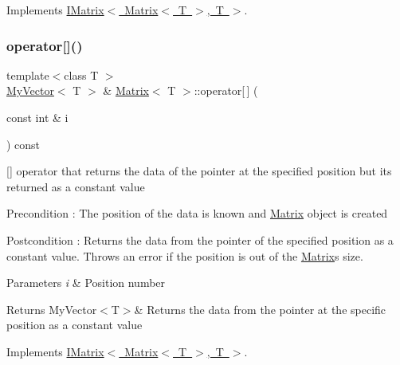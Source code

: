 Implements \mbox{\hyperlink{class_i_matrix_a3cfb2490e2849c6c19c1979066a64818}{I\+Matrix$<$ Matrix$<$ T $>$, T $>$}}.

\mbox{\label{class_matrix_a56c7f18f272e74bee2b616eba702fc87}} 
\subsubsection{\texorpdfstring{operator[]()}{operator[]()}\hspace{0.1cm}{\footnotesize\ttfamily [2/2]}}
{\footnotesize\ttfamily template$<$class T $>$ \\
\mbox{\hyperlink{class_my_vector}{My\+Vector}}$<$ T $>$ \& \mbox{\hyperlink{class_matrix}{Matrix}}$<$ T $>$\+::operator\mbox{[}$\,$\mbox{]} (\begin{DoxyParamCaption}\item[{const int \&}]{i }\end{DoxyParamCaption}) const\hspace{0.3cm}{\ttfamily [virtual]}}



\mbox{[}\mbox{]} operator that returns the data of the pointer at the specified position but its returned as a constant value 

\begin{DoxyPrecond}{Precondition}
\+: The position of the data is known and \mbox{\hyperlink{class_matrix}{Matrix}} object is created 
\end{DoxyPrecond}
\begin{DoxyPostcond}{Postcondition}
\+: Returns the data from the pointer of the specified position as a constant value. Throws an error if the position is out of the \mbox{\hyperlink{class_matrix}{Matrix}}\textquotesingle{}s size. 
\end{DoxyPostcond}

\begin{DoxyParams}{Parameters}
{\em i} & Position number \\
\hline
\end{DoxyParams}
\begin{DoxyReturn}{Returns}
My\+Vector$<$\+T$>$\& Returns the data from the pointer at the specific position as a constant value 
\end{DoxyReturn}


Implements \mbox{\hyperlink{class_i_matrix_a1ed62ee6700728045083c7f0df3e3e62}{I\+Matrix$<$ Matrix$<$ T $>$, T $>$}}.

